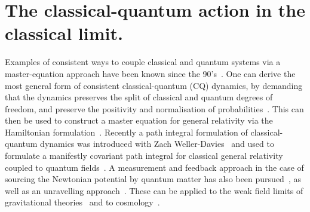 \documentclass[aps,pra,amsmath,amssymb,amsthm,floatfix,nofootinbib,notitlepage,superscriptaddress,10pt]{revtex4-2}
\begin{document}
\section{The classical-quantum action in the classical limit.}
\label{app: CQ}
Examples of consistent ways to couple classical and quantum systems via a master-equation approach have been known since the 90's~\cite{blanchard1993interaction,blanchard1995event,diosi1995quantum}. One can derive the most general form of consistent classical-quantum (CQ) dynamics, by
demanding that the dynamics preserves the split of classical and quantum degrees of freedom, and preserve the positivity and normalisation of probabilities~\cite{oppenheim2018post,UCLPawula}. This can then be used to construct a master equation for general relativity via the Hamiltonian formulation~\cite{oppenheim2018post,UCL2022constraints,oppenheim2021constraints}. Recently a path integral formulation of classical-quantum dynamics was introduced with Zach Weller-Davies~\cite{oppenheim2023path} and used to formulate a manifestly covariant path integral for classical general relativity coupled to quantum fields~\cite{oppenheim2023covariant}.
A measurement and feedback approach in the case of sourcing the Newtonian potential by quantum matter has also been pursued~\cite{kafri2014classical,tilloy2016sourcing,tilloy2017principle}, as well as an unravelling approach~\cite{UCLunrav,UCL2022semi}.
These can be applied to the weak field limits of gravitational theories~\cite{layton2023weak,UCLNordstrom} and to cosmology~\cite{UCLcosmo}.
\end{document}
